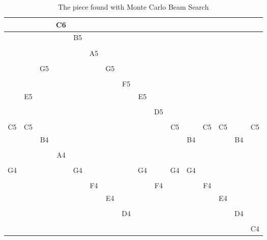 \documentclass{article}
\begin{document}
\begin{table}[h!]
	\caption{The piece found with Monte Carlo Beam Search}
	\label{table:piece}
	\begin{center}
		\begin{tabular}{|c|c|c|c|c|c|c|c|c|c|c|c|c|c|c|c|}
			\hline
			& & & C6 & & & & & & & & & & & & \\
			\hline
			& & & & B5 & & & & & & & & & & & \\
			\hline
			& & & & & & & & & & & & & & & \\
			\hline
			& & & & & A5 & & & &  & & & & & & \\
			\hline
			& & & & & & & & & & & & & & & \\
			\hline
			& & G5 & & & & G5 & & & & & & & & & \\
			\hline
			& & & & & & & & & & & & & & & \\
			\hline
			& & & & & & & F5 & & & & & & & & \\
			\hline
			& E5 & & & & & & & E5 & & & & & & & \\
			\hline
			& & & & & & & & & & & & & & & \\
			\hline
			& & & & & & & & & D5 & & & & & & \\
			\hline
			& & & & & & & & & & & & & & & \\
			\hline
			C5 & C5 & & & & & & & & & C5 & & C5 & C5 & & C5 \\
			\hline
			& & B4 & & & & & & & & & B4 & & & B4 & \\
			\hline
			& & & & & & & & & & & & & & & \\
			\hline
			& & & A4 & & & & & & & & & & & & \\
			\hline
			& & & & & & & & & & & & & & & \\
			\hline
			G4 & & & & G4 & & & & G4 & & G4 & G4 & & & & \\
			\hline
			& & & & & & & & & & & & & & & \\
			\hline
			& & & & & F4 & & & & F4 & & & F4 & & & \\
			\hline
			& & & & & & E4 & & & & & & & E4 & & \\
			\hline
			& & & & & & & & & & & & & & & \\
			\hline
			& & & & & & & D4 & & & & & & & D4 & \\
			\hline
			& & & & & & & & & & & & & & & \\
			\hline
			& & & & & & & & & & & & & & & C4 \\
			\hline
		\end{tabular}
	\end{center}
\end{table}
\end{document}

